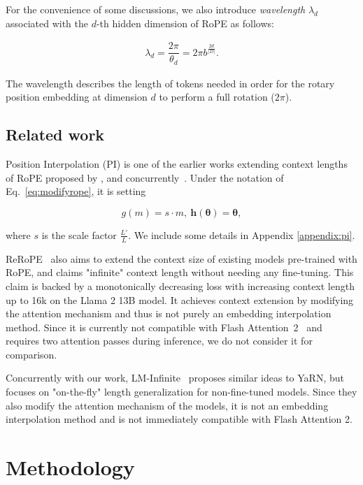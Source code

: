 For the convenience of some discussions, we also introduce \emph{wavelength} $\lambda_d$ associated with the $d$-th hidden dimension of RoPE as follows:

\begin{align} \label{eq:wavelength}
    \lambda_d = \dfrac{2\pi}{\theta_d} = 2\pi b^{\frac{2d}{|D|}}.
\end{align}

The wavelength describes the length of tokens needed in order for the rotary position embedding at dimension $d$ to perform a full rotation ($2\pi$).

\subsection{Related work}

Position Interpolation (PI) is one of the earlier works extending context lengths of RoPE proposed by \citet{chen2023extending}, and concurrently~\citet{kaiokendev}. Under the notation of Eq.~\ref{eq:modifyrope}, it is setting

\begin{equation}
g(m) = s\cdot m, ~{\bm{h}}(\bm{\theta}) = \bm{\theta},
\end{equation}

where $s$ is the scale factor $\frac{L'}{L}$. We include some details in Appendix \ref{appendix:pi}.

ReRoPE~\citep{rerope2023} also aims to extend the context size of existing models pre-trained with RoPE, and claims "infinite" context length without needing any fine-tuning. This claim is backed by a monotonically decreasing loss with increasing context length up to 16k on the Llama 2 13B model. It achieves context extension by modifying the attention mechanism and thus is not purely an embedding interpolation method. Since it is currently not compatible with Flash Attention~2~\citep{dao2023flashattention2} and requires two attention passes during inference, we do not consider it for comparison.

Concurrently with our work, LM-Infinite~\citep{han2023lminfinite} proposes similar ideas to YaRN, but focuses on "on-the-fly" length generalization for non-fine-tuned models. Since they also modify the attention mechanism of the models, it is not an embedding interpolation method and is not immediately compatible with Flash Attention 2.

\section{Methodology}


